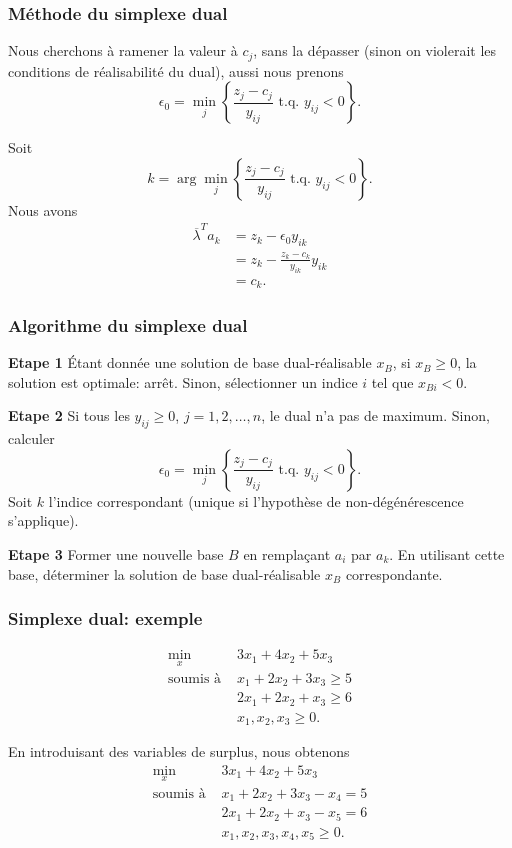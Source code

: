\documentclass[usepdftitle=false]{beamer}
\begin{document}
\begin{frame}
\frametitle{Méthode du simplexe dual}

Nous cherchons à ramener la valeur à $c_j$, sans la dépasser (sinon on violerait les conditions de réalisabilité du dual), aussi nous prenons
\[
\epsilon_0 = \min_j \left\lbrace \frac{z_j-c_j}{y_{ij}}\mbox{ t.q. } y_{ij} < 0 \right\rbrace.
\]

\mbox{}

Soit
\[
k = \arg\min_j \left\lbrace \frac{z_j-c_j}{y_{ij}}\mbox{ t.q. } y_{ij} < 0 \right\rbrace.
\]
Nous avons
\begin{align*}
\overline{\lambda}^T a_k &= z_k - \epsilon_0 y_{ik} \\
 &= z_k - \frac{z_k-c_k}{y_{ik}} y_{ik} \\
 & = c_k. 
\end{align*}

\end{frame}

\begin{frame}
\frametitle{Algorithme du simplexe dual}

{\bf Etape 1}
\'Etant donnée une solution de base dual-réalisable $x_B$, si $x_B \geq 0$, la solution est optimale: arrêt. Sinon, sélectionner un indice $i$ tel que $x_{Bi} < 0$.

\mbox{}

{\bf Etape 2}
Si tous les $y_{ij} \geq 0$, $j = 1, 2,\ldots,n$, le dual n'a pas de maximum.
Sinon, calculer
\[
\epsilon_0 = \min_j \left\lbrace \frac{z_j-c_j}{y_{ij}}\mbox{ t.q. } y_{ij} < 0 \right\rbrace.
\]
Soit $k$ l'indice correspondant (unique si l'hypothèse de non-dégénérescence s'applique).

\mbox{}

{\bf Etape 3}
Former une nouvelle base $B$ en remplaçant $a_i$ par $a_k$.
En utilisant cette base, déterminer la solution de base dual-réalisable $x_B$ correspondante.

\end{frame}

\begin{frame}
\frametitle{Simplexe dual: exemple}

\begin{align*}
\min_x \ & 3x_1 + 4x_2 + 5x_3 \\
\mbox{soumis à } & x_1 + 2x_2 + 3x_3 \geq 5 \\
& 2x_1 + 2x_2 + x_3 \geq 6 \\
& x_1, x_2, x_3 \geq 0.
\end{align*}

\mbox{}

En introduisant des variables de surplus, nous obtenons
\begin{align*}
\min_x \ & 3x_1 + 4x_2 + 5x_3 \\
\mbox{soumis à } & x_1 + 2x_2 + 3x_3 - x_4 = 5 \\
& 2x_1 + 2x_2 + x_3 -x_5 = 6 \\
& x_1, x_2, x_3, x_4, x_5 \geq 0.
\end{align*}

\end{frame}
\end{document}
